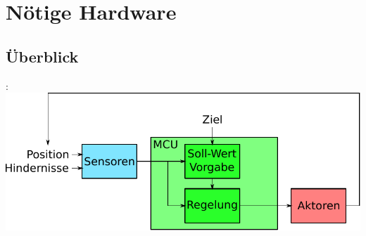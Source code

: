 \documentclass{beamer}
\begin{document}
\section{Nötige Hardware}

\subsection{Überblick}
\begin{frame}{\insertsection: \insertsubsection}
	\includegraphics[width=\linewidth]{eva}
\end{frame}
\end{document}

